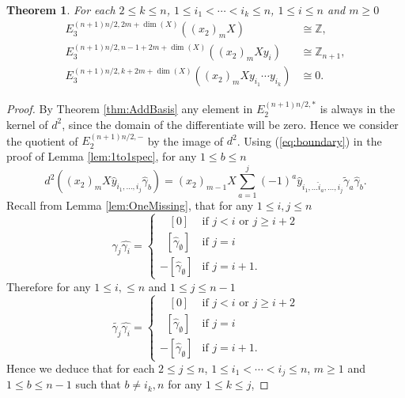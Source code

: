 \documentclass{article}
\theoremstyle{plain}
\newtheorem{thm}{Theorem}[section]
\theoremstyle{definition}
\numberwithin{thm}{section}
\begin{document}
			
			\begin{thm}\label{thm:LastColumn}
				For each $2 \leq k\leq n$, $1\leq i_1 <\cdots< i_k \leq n$, $1\leq i \leq n$ and $m\geq 0$
				\begin{align*}
					E_3^{(n+1)n/2,2m+\dim(X)}((x_2)_mX)													&	\cong		\mathbb{Z}, \\
					E_3^{(n+1)n/2,n-1+2m+\dim(X)}((x_2)_mXy_i)										&	\cong		\mathbb{Z}_{n+1}, \\
					E_3^{(n+1)n/2,k+2m+\dim(X)}((x_2)_mXy_{i_1}\cdots y_{i_k})		&	\cong		0.
				\end{align*}
			\end{thm}
			\begin{proof}
				By Theorem \ref{thm:AddBasis}
				any element in $E_2^{(n+1)n/2,*}$ is always in the kernel of $d^2$, since the domain of the differentiate will be zero.
				Hence we consider the quotient of $E_2^{(n+1)n/2,-}$ by the image of $d^2$.
				Using (\ref{eq:boundary}) in the proof of Lemma \ref{lem:1to1spec}, for any $1\leq b\leq n$
				\begin{equation*}
					d^2((x_2)_{m}X\hat{y}_{{i_1},\dots,{i_j}}\hat{\gamma}_b)=(x_2)_{m-1}X\sum_{a=1}^{j}{(-1)^a\hat{y}_{i_1,\dots\hat{i}_a,\dots,i_j}\tilde{\gamma}_a\hat{\gamma}_b}.
				\end{equation*}
				Recall from Lemma \ref{lem:OneMissing}, that for any $1\leq i,j\leq n$
				\begin{equation*}
					\gamma_j\hat{\gamma_i}=
					\begin{cases}
							\;\;\; [0]  &\mbox{if  } j < i \text{ or } j \geq i+2 
							\\
							\;\; [\hat{\gamma}_{\emptyset}] &\text{if  } j=i
							\\
							-[\hat{\gamma}_{\emptyset}] &\text{if  } j=i+1
							.
					\end{cases}
				\end{equation*}
				Therefore for any $1\leq i,\leq n$ and $1 \leq j \leq n-1$
				\begin{equation*}
					\tilde{\gamma_j}\hat{\gamma_i}=
					\begin{cases}
							\;\;\; [0]  &\mbox{if  } j < i \text{ or } j \geq i+2 
							\\
							\;\; [\hat{\gamma}_{\emptyset}] &\text{if  } j=i
							\\
							-[\hat{\gamma}_{\emptyset}] &\text{if  } j=i+1
							.
					\end{cases}
				\end{equation*}
				Hence we deduce that for each $2\leq j \leq n$, $1\leq i_1<\cdots<i_j\leq n$, $m\geq 1$ and $1\leq b \leq n-1$ such that $b\neq i_k,n$ for any $1\leq k \leq j$,

\end{proof}
\end{document}
